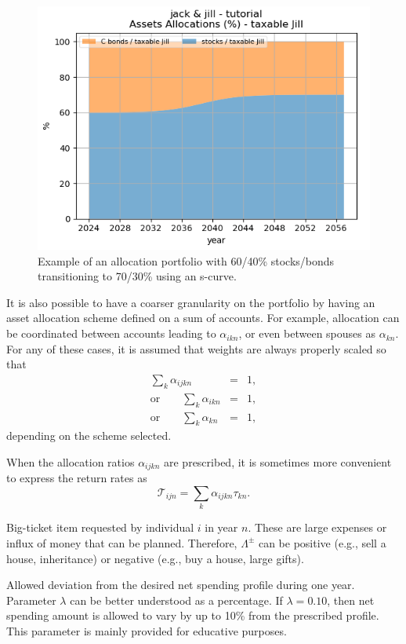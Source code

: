 \documentclass{report}[fleqn,12pt]
\begin{document}
\begin{description}[leftmargin=4em,style=multiline]
	\begin{figure}[t]
	\includegraphics{allocations.png}
		\caption{\small Example of an allocation portfolio with 60/40\% stocks/bonds 
		transitioning to 70/30\% using an s-curve. \label{Fig:allocations}}
	\end{figure}
	It is also possible to have a coarser granularity on the portfolio by
	having an asset allocation scheme
	defined on a sum of accounts. For example, allocation can be coordinated between accounts
	leading to $\alpha_{ikn}$, or even between spouses as $\alpha_{kn}$.
	For any of these cases, it is assumed that weights are always properly scaled so that
	\begin{eqnarray}
		\sum_k \alpha_{ijkn} &=& 1, \nonumber\\
		\text{or} \qquad \sum_k \alpha_{ikn} &=& 1, \nonumber\\
		\text{or} \qquad \sum_k \alpha_{kn} &=& 1,
	\end{eqnarray}
	depending on the scheme selected.

\item[$\mathcal{T}_{ijn}$]
	When the allocation ratios $\alpha_{ijkn}$ are prescribed,
	it is sometimes more convenient to express the return rates as
	\begin{equation}
		\mathcal{T}_{ijn} = \sum_k \alpha_{ijkn} \tau_{kn}.
	\end{equation}

\item [$\Lambda^\pm_{in}$]
	Big-ticket item requested by individual $i$ in year $n$.
	These are large expenses or influx of money
	that can be planned. Therefore, $\Lambda^\pm$ can be positive
	(e.g., sell a house, inheritance) or negative (e.g., buy a house, large gifts).
\item [$\lambda$]
        Allowed deviation from the desired net spending profile during one year. Parameter
        $\lambda$ can be better understood as a percentage. If $\lambda = 0.10$, then net spending
	amount is allowed to vary by up to 10\% from the prescribed profile.
	This parameter is mainly provided for educative purposes.


\end{description}
\end{document}
